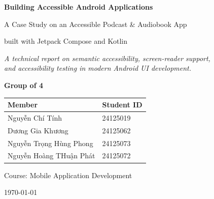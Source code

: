 \begin{titlepage}
	\centering
	\vspace*{1.2cm}

	{\huge\bfseries\color{brandblue} Building Accessible Android Applications\par}
	\vspace{0.4cm}
	{\large A Case Study on an Accessible Podcast \& Audiobook App\par}
	{\large built with Jetpack Compose and Kotlin\par}

	\vspace{1.0cm}

	\vspace{1.0cm}
	{\itshape A technical report on semantic accessibility, screen-reader support,\\ and accessibility testing in modern Android UI development.\par}

	\vspace{1.4cm}
	{\large\bfseries Group of 4\par}
	\vspace{0.5cm}
	\begin{tabular}{ll}
		\toprule
		\textbf{Member}         & \textbf{Student ID} \\
		\midrule
		Nguyễn Chí Tính         & 24125019            \\
		Dương Gia Khương        & 24125062            \\
		Nguyễn Trọng Hùng Phong & 24125073            \\
		Nguyễn Hoàng THuận Phát & 24125072            \\
		\bottomrule
	\end{tabular}
	\vfill
	{\small Course: Mobile Application Development\par}
	{\small \today\par}
\end{titlepage}
